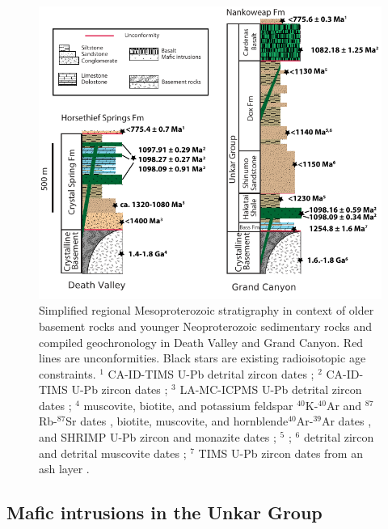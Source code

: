 \begin{figure}[h!]
\centering
\includegraphics[width=\textwidth]{figure/Zhang2024b/DV_GC_Mesoproterozoic_strat_columns.pdf}
\caption{\footnotesize Simplified regional Mesoproterozoic stratigraphy in context of older basement rocks and younger Neoproterozoic sedimentary rocks and compiled geochronology in Death Valley and Grand Canyon. Red lines are unconformities. Black stars are existing radioisotopic age constraints. $^1$ CA-ID-TIMS U-Pb detrital zircon dates \citep{Dehler2023a}; $^2$ CA-ID-TIMS U-Pb zircon dates \citep{Mohr2024a}; $^3$ LA-MC-ICPMS U-Pb detrital zircon dates \citep{Mahon2014b}; $^4$ muscovite, biotite, and potassium feldspar $^{40}$K-$^{40}$Ar and $^{87}$Rb-$^{87}$Sr dates \citep{Lanphere1964b}, biotite, muscovite, and hornblende$^{40}$Ar-$^{39}$Ar dates \cite{Labotka1985a}, and SHRIMP U-Pb zircon and monazite dates \cite{Barth2001a, Barth2009a}; $^5$ \cite{Mulder2017a}; $^6$ detrital zircon and detrital muscovite dates \cite{Timmons2005a}; $^7$ TIMS U-Pb zircon dates from an ash layer \cite{Timmons2005a}.}
\label{fig:DV_GC_strat_columns}
\end{figure}

\subsection*{Mafic intrusions in the Unkar Group}


